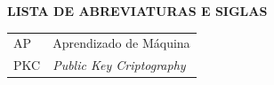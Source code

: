 \thispagestyle{empty}

\begin{center}
    \textbf{\normalsize LISTA DE ABREVIATURAS E SIGLAS}
\end{center}

\vspace{1cm}

{
\renewcommand{\arraystretch}{1.8}

\begin{tabular}{p{2cm} l}
    AP  & Aprendizado de Máquina \\
    PKC  & \textit{Public Key Criptography} \\
\end{tabular}
}